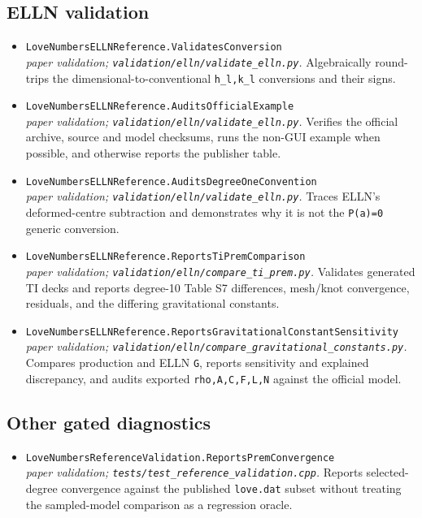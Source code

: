 \subsection*{ELLN validation}
\begin{itemize}[leftmargin=1.4em,itemsep=0.35em]
\item {\footnotesize\texttt{LoveNumbersELLNReference.ValidatesConversion}}\\
\emph{paper validation; \texttt{validation/elln/validate\_elln.py}.} Algebraically round-trips the dimensional-to-conventional \texttt{h\_l,k\_l} conversions and their signs.
\item {\footnotesize\texttt{LoveNumbersELLNReference.AuditsOfficialExample}}\\
\emph{paper validation; \texttt{validation/elln/validate\_elln.py}.} Verifies the official archive, source and model checksums, runs the non-GUI example when possible, and otherwise reports the publisher table.
\item {\footnotesize\texttt{LoveNumbersELLNReference.AuditsDegreeOneConvention}}\\
\emph{paper validation; \texttt{validation/elln/validate\_elln.py}.} Traces ELLN's deformed-centre subtraction and demonstrates why it is not the \texttt{P(a)=0} generic conversion.
\item {\footnotesize\texttt{LoveNumbersELLNReference.ReportsTiPremComparison}}\\
\emph{paper validation; \texttt{validation/elln/compare\_ti\_prem.py}.} Validates generated TI decks and reports degree-10 Table S7 differences, mesh/knot convergence, residuals, and the differing gravitational constants.
\item {\footnotesize\texttt{LoveNumbersELLNReference.ReportsGravitationalConstantSensitivity}}\\
\emph{paper validation; \texttt{validation/elln/compare\_gravitational\_constants.py}.} Compares production and ELLN \texttt{G}, reports sensitivity and explained discrepancy, and audits exported \texttt{rho,A,C,F,L,N} against the official model.
\end{itemize}
\subsection*{Other gated diagnostics}
\begin{itemize}[leftmargin=1.4em,itemsep=0.35em]
\item {\footnotesize\texttt{LoveNumbersReferenceValidation.ReportsPremConvergence}}\\
\emph{paper validation; \texttt{tests/test\_reference\_validation.cpp}.} Reports selected-degree convergence against the published \texttt{love.dat} subset without treating the sampled-model comparison as a regression oracle.
\end{itemize}
